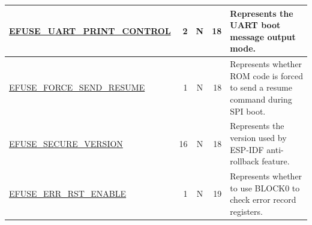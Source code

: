 \begin{longtable}[c]{ |m{8.2cm}|r|c|r|m{9cm}| }
    \hline
    \hyperref[fielddesc:EFUSEUARTPRINTCONTROL]{EFUSE\_UART\_PRINT\_CONTROL}  & 2 & N & 18 & Represents the UART boot message output mode. \\
    \hline
    \hyperref[fielddesc:EFUSEFORCESENDRESUME]{EFUSE\_FORCE\_SEND\_RESUME} & 1 & N & 18 & Represents whether ROM code is forced to send a resume command during SPI boot. \\  
    \hline
    \hyperref[fielddesc:EFUSESECUREVERSION]{EFUSE\_SECURE\_VERSION} & 16 & N & 18 & Represents the version used by ESP-IDF anti-rollback feature.\\\hline
    \hyperref[fielddesc:EFUSEERRRSTENABLE]{EFUSE\_ERR\_RST\_ENABLE} & 1 & N & 19 & Represents whether to use BLOCK0 to check error record registers.\\\hline
\end{longtable}
